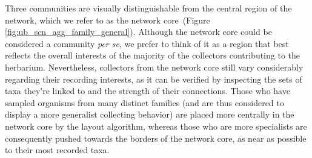 Three communities are visually distinguishable from the central region of the network, which we refer to as the network core~(Figure \ref{fig:ub_scn_agg_family_general}).
Although the network core could be considered a community \textit{per se}, we prefer to think of it as a region that best reflects the overall interests of the majority of the collectors contributing to the herbarium.
Nevertheless, collectors from the network core still vary considerably regarding their recording interests, as it can be verified by inspecting the sets of taxa they're linked to and the strength of their connections. 
Those who have sampled organisms from many distinct families (and are thus considered to display a more generalist collecting behavior) are placed more centrally in the network core by the layout algorithm, whereas those who are more specialists are consequently pushed towards the borders of the network core, as near as possible to their most recorded taxa.

